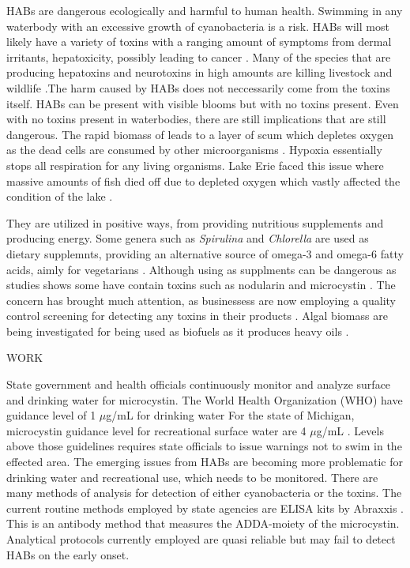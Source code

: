\documentclass{ou-thesis}
\begin{document}
HABs are dangerous ecologically and harmful to human health. Swimming in any waterbody with an excessive growth of cyanobacteria is a risk. HABs will most likely have a variety of toxins with a ranging amount of symptoms from dermal irritants, hepatoxicity, possibly leading to cancer \cite{paerl_controlling_2011}. Many of the species that are producing hepatoxins and neurotoxins in high amounts are killing livestock and wildlife \cite{anderson_harmful_2002}.The harm caused by HABs does not neccessarily come from the toxins itself. HABs can be present with visible blooms but with no toxins present. Even with no toxins present in waterbodies, there are still implications that are still dangerous. The rapid biomass of leads to a layer of scum which depletes oxygen as the dead cells are consumed by other microorganisms \cite{anderson_harmful_2002}. Hypoxia essentially stops all respiration for any living organisms. Lake Erie faced this issue where massive amounts of fish died off due to depleted oxygen which vastly affected the condition of the lake \cite{charlton_oxygen_1980}.

They are utilized in positive ways, from providing nutritious supplements and producing energy. Some genera such as \emph{Spirulina} and \emph{Chlorella} are used as dietary supplemnts, providing an alternative source of omega-3 and omega-6 fatty acids, aimly for vegetarians \cite{guevara-gonzalez_microalgae_2014}. Although using as supplments can be dangerous as studies shows some have contain toxins such as nodularin and microcystin \cite{turner_development_2018}. The concern has brought much attention, as businessess are now employing a quality control screening for detecting any toxins in their products \cite{manali_detection_2017}. Algal biomass are being investigated for being used as biofuels as it produces heavy oils \cite{demirbas_use_2010}.

WORK

State government and health officials continuously monitor and analyze surface and drinking water for microcystin. The World Health Organization (WHO) have guidance level of 1 $\mu$g/mL for drinking water \cite{world_health_organization_guidelines_2003} For the state of Michigan, microcystin guidance level for recreational surface water are 4 $\mu$g/mL \cite{us_epa_draft_2016}. Levels above those guidelines requires state officials to issue warnings not to swim in the effected area. The emerging issues from HABs are becoming more problematic for drinking water and recreational use, which needs to be monitored. There are many methods of analysis for detection of either cyanobacteria or the toxins. The current routine methods employed by state agencies are ELISA kits by Abraxxis . This is an antibody method that measures the ADDA-moiety of the microcystin. Analytical protocols currently employed are quasi reliable but may fail to detect HABs on the early onset.
\end{document}
